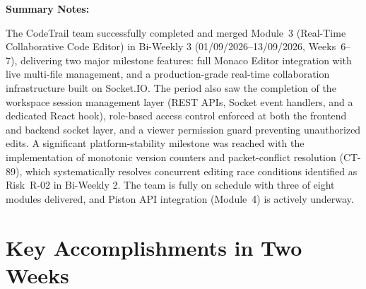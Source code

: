 \documentclass[11pt,a4paper]{article}
\begin{document}
\vspace{8pt}
\textbf{Summary Notes:}

The CodeTrail team successfully completed and merged Module~3 (Real-Time Collaborative Code Editor) in Bi-Weekly 3 (01/09/2026--13/09/2026, Weeks~6--7), delivering two major milestone features: full Monaco Editor integration with live multi-file management, and a production-grade real-time collaboration infrastructure built on Socket.IO. The period also saw the completion of the workspace session management layer (REST APIs, Socket event handlers, and a dedicated React hook), role-based access control enforced at both the frontend and backend socket layer, and a viewer permission guard preventing unauthorized edits. A significant platform-stability milestone was reached with the implementation of monotonic version counters and packet-conflict resolution (CT-89), which systematically resolves concurrent editing race conditions identified as Risk~R-02 in Bi-Weekly 2. The team is fully on schedule with three of eight modules delivered, and Piston API integration (Module~4) is actively underway.

\section{Key Accomplishments in Two Weeks}
\end{document}
